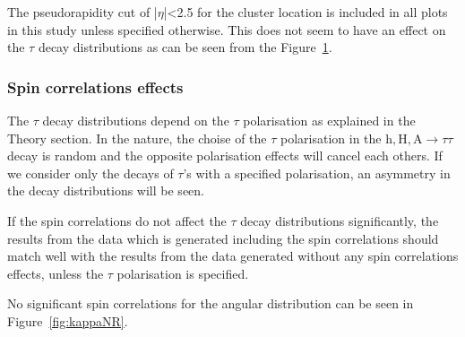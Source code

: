 \documentclass[a4paper,12pt,titlepage]{article}
\begin{document}
\begin{figure}[htbp]
  \begin{center}
    \leavevmode
  
  
  \label{fig:etaeivaikuta1}
  
\end{center}
\end{figure}

The pseudorapidity cut of |$\eta$|<2.5 for the cluster location is included in all plots in this study unless specified otherwise. This does not seem to have an effect on the $\tau$ decay distributions as can be seen from the Figure~\ref{fig:etaeivaikuta1}.

\subsubsection{Spin correlations effects}
The $\tau$ decay distributions depend on the $\tau$ polarisation as explained in the Theory section. In the nature, the choise of the $\tau$ polarisation in the $\mathrm{h, H, A} \rightarrow \tau \tau$ decay is random and the opposite polarisation effects will cancel each others. If we consider only the decays of $\tau$'s with a specified polarisation, an asymmetry in the decay distributions will be seen.

If the spin correlations do not affect the $\tau$ decay distributions significantly, the results from the data which is generated including the spin correlations should match well with the results from the data generated without any spin correlations effects, unless the $\tau$ polarisation is specified. 

No significant spin correlations for the angular distribution can be seen in Figure~\ref{fig:kappaNR}.
\end{document}
